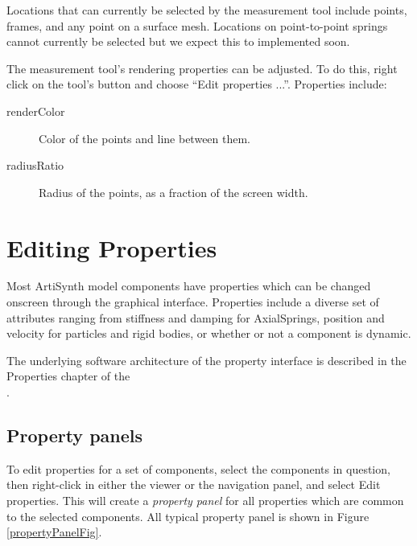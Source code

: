 \documentclass{article}
\begin{document}
\begin{sideblock}
Locations that can currently be selected by the measurement tool include
points, frames, and any point on a surface mesh. Locations on point-to-point
springs cannot currently be selected but we expect this to implemented soon.
\end{sideblock}

The measurement tool's rendering properties can be
adjusted. To do this, right click on the tool's button and choose {\sf
``Edit properties ...''}. Properties include:

\begin{description}

\item[renderColor] \mbox{}

Color of the points and line between them.

\item[radiusRatio] \mbox{}

Radius of the points, as a fraction of the screen width.

\end{description}

\section{Editing Properties}

Most ArtiSynth model components have properties which can be 
changed onscreen through the graphical interface. Properties
include a diverse set of attributes ranging from stiffness and
damping for AxialSprings, position and velocity for particles and
rigid bodies, or whether or not a component is dynamic.

The underlying software architecture of the property interface is 
described in the Properties chapter of the\\
.

\subsection{Property panels}
\label{propertyPanelsSec}

To edit properties for a set of components, select the components in
question, then right-click in either the viewer or the navigation
panel, and select {\sf Edit properties}. This will create a {\it property
panel} for all properties which are common to the selected components.
All typical property panel is shown in Figure \ref{propertyPanelFig}.
\end{document}
